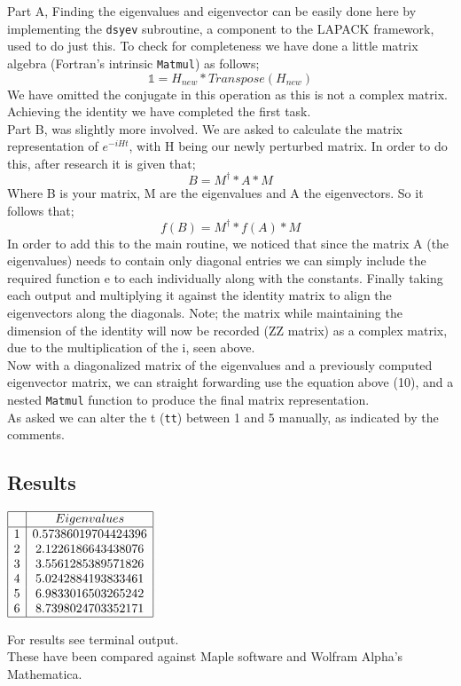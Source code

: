 \documentclass[12pt,letterpaper,notitlepage]{article}
\begin{document}
Part A, Finding the eigenvalues and eigenvector can be easily done here by implementing the {\tt dsyev} subroutine, a component to the LAPACK framework, used to do just this. To check for completeness we have done a little matrix algebra (Fortran's intrinsic {\tt Matmul})  as follows; 
	\begin{equation}
		\mathbb{1}=H_{new}*Transpose(H_{new}) 
	\end{equation}
We have omitted the conjugate in this operation as this is not a complex matrix. 
Achieving the identity we have completed the first task. \\
Part B, was slightly more involved. We are asked to calculate the matrix representation of $ e^{-iHt} $, with H being our newly perturbed matrix. In order to do this, after research it is given that; 
	\begin{equation}
		B=M^{\dagger} * A * M 
	\end{equation}
Where B is your matrix, M are the eigenvalues and A the eigenvectors. So it follows that;
	\begin{equation}
		f(B)=M^{\dagger} * f(A) * M 
	\end{equation}
In order to add this to the main routine, we noticed that since the matrix A (the eigenvalues) needs to contain only diagonal entries we can simply  include the required function e to each individually along with the constants. Finally taking each output and multiplying it against the identity matrix to align the eigenvectors along the diagonals. Note; the matrix while maintaining the dimension of the identity will now be recorded (ZZ matrix) as a complex matrix, due to the multiplication of the i, seen above. \\
Now with a diagonalized matrix of the eigenvalues and a previously computed eigenvector matrix, we can straight forwarding use the equation above (10), and a nested {\tt Matmul} function to produce the final matrix representation. \\
As asked we can alter the t ({\tt tt}) between 1 and 5 manually, as indicated by the comments.
\newpage
\subsection{Results}
\begin {center}
	$\begin{array} {|c|c|}
		\hline
	       & Eigenvalues\\
	       \hline
	   1  &0.57386019704424396\\
	   2  &2.1226186643438076\\
           3  &3.5561285389571826\\
           4  &5.0242884193833461\\
           5  &6.9833016503265242\\
           6  &8.7398024703352171\\
          \hline
      \end{array}$
      \end{center}
For results see terminal output.
 \\
These have been compared against Maple software and Wolfram Alpha's Mathematica. 
\end{document}

